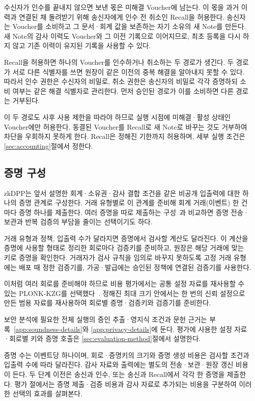 수신자가 인수를 끝내지 않으면 보낸 몫은 미해결 Voucher에 남는다. 이 몫을 과거 이력과 연결된 채 돌려받기 위해 송신자에게 인수 전 취소인 Recall을 허용한다. 송신자는 Voucher를 소비하고 그 문서·회계 값을 보존하는 자기 소유의 새 Note를 만든다. 새 Note의 감사 이력도 Voucher와 그 이전 기록으로 이어지므로, 최초 등록을 다시 하지 않고 기존 이력이 유지된 기록을 사용할 수 있다.

Recall을 허용하면 하나의 Voucher를 인수하거나 취소하는 두 경로가 생긴다. 두 경로가 서로 다른 식별자를 쓰면 원장이 같은 이전의 중복 해결을 알아내지 못할 수 있다. 따라서 인수 권한은 수신자의 비밀로, 취소 권한은 송신자의 비밀로 각각 증명하되 소비 여부는 같은 해결 식별자로 관리한다. 먼저 승인된 경로가 이를 소비하면 다른 경로는 거부된다.

이 두 경로도 사후 사용 제한을 따라야 하므로 실행 시점에 미해결·활성 상태인 Voucher에만 허용한다. 동결된 Voucher를 Recall로 새 Note로 바꾸는 것도 거부하여 차단을 우회하지 못하게 한다. Recall은 정해진 기한까지 허용하며, 세부 실행 조건은 \ref{sec:accounting}절에서 정한다.

\subsection{증명 구성}
\label{sec:proof-configuration}

zkDPP는 앞서 설명한 회계·소유권·감사 결합 조건을 같은 비공개 입출력에 대한 하나의 증명 관계로 구성한다. 거래 유형별로 이 관계를 준비해 회계 거래(이벤트) 한 건마다 증명 하나를 제출한다. 여러 증명을 따로 제출하는 구성~\cite{sahai-supply-chain-2020}과 비교하면 증명 전송·보관과 반복 검증의 부담을 줄이는 선택이기도 하다.

거래 유형과 정책, 입출력 수가 달라지면 증명에서 검사할 계산도 달라진다. 이 계산을 증명에 사용할 형태로 정리한 회로마다 검증키를 준비하고, 원장은 해당 거래에 맞는 키로 증명을 확인한다. 거래자가 검사 규칙을 임의로 바꾸지 못하도록 고정 거래 유형에는 배포 때 정한 검증기를, 가공·발급에는 승인된 정책에 연결된 검증기를 사용한다.

이처럼 여러 회로를 준비해야 하므로 비용 평가에서는 공통 설정 자료를 재사용할 수 있는 PLONK-KZG를 선택했다~\cite{gabizon-plonk-2019}. 정해진 최대 크기 안에서는 한 번의 신뢰 설정으로 만든 범용 자료를 재사용하여 회로별 증명·검증키와 검증기를 준비한다.

보안 분석에 필요한 전체 실행의 증인 추출·영지식 조건과 문헌 근거는 부록~\ref{app:soundness-details}와 \ref{app:privacy-details}에 둔다. 평가에 사용한 설정 자료·회로별 키와 증명 호출은 \ref{sec:evaluation-method}절에서 설명한다.

증명 수는 이벤트당 하나이며, 회로·증명키의 크기와 증명 생성 비용은 검사할 조건과 입출력 수에 따라 달라진다. 감사 자료와 출력에는 별도의 전송·보관·원장 갱신 비용이 든다. 두 단계 이전은 송신과 인수, 또는 송신과 Recall에서 각각 한 증명을 제출한다. 평가 절에서는 증명 제출·검증 비용과 감사 자료로 추가되는 비용을 구분하여 이러한 선택의 효과를 살펴본다.

